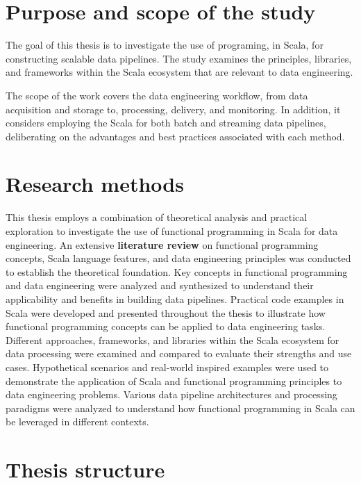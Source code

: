 \section*{Purpose and scope of the study}

The goal of this thesis is to investigate the use of programing, in Scala, for constructing scalable data pipelines. The study examines the principles, libraries, and frameworks within the Scala ecosystem that are relevant to data engineering.

The scope of the work covers the data engineering workflow, from data acquisition and storage to, processing, delivery, and monitoring. In addition, it considers employing the Scala for both batch and streaming data pipelines, deliberating on the advantages and best practices associated with each method.

\section*{Research methods}

 This thesis employs a combination of theoretical analysis and practical exploration to investigate the use of functional programming in Scala for data engineering. An extensive \textbf{literature review} on functional programming concepts, Scala language features, and data engineering principles was conducted to establish the theoretical foundation. Key concepts in functional programming and data engineering were analyzed and synthesized to understand their applicability and benefits in building data pipelines. Practical code examples in Scala were developed and presented throughout the thesis to illustrate how functional programming concepts can be applied to data engineering tasks. Different approaches, frameworks, and libraries within the Scala ecosystem for data processing were examined and compared to evaluate their strengths and use cases.  Hypothetical scenarios and real-world inspired examples were used to demonstrate the application of Scala and functional programming principles to data engineering problems. Various data pipeline architectures and processing paradigms were analyzed to understand how functional programming in Scala can be leveraged in different contexts.

\section*{Thesis structure}

